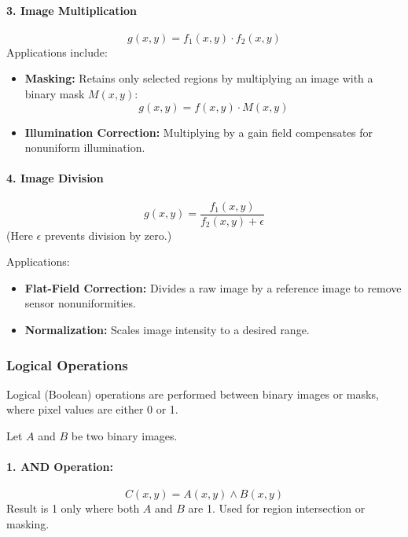 \documentclass[12pt,a4paper]{AnantDocumentation}
\begin{document}
\paragraph{3. Image Multiplication}
\begin{equation}
g(x, y) = f_1(x, y) \cdot f_2(x, y)
\end{equation}
Applications include:
\begin{itemize}
\item \textbf{Masking:} Retains only selected regions by multiplying an image with a binary mask $M(x,y)$:
\[
g(x, y) = f(x, y) \cdot M(x, y)
\]
\item \textbf{Illumination Correction:} Multiplying by a gain field compensates for nonuniform illumination.
\end{itemize}

\paragraph{4. Image Division}
\begin{equation}
g(x, y) = \frac{f_1(x, y)}{f_2(x, y) + \epsilon}
\end{equation}
(Here $\epsilon$ prevents division by zero.)

Applications:
\begin{itemize}
\item \textbf{Flat-Field Correction:} Divides a raw image by a reference image to remove sensor nonuniformities.
\item \textbf{Normalization:} Scales image intensity to a desired range.
\end{itemize}

\subsubsection{Logical Operations}
Logical (Boolean) operations are performed between binary images or masks, where pixel values are either 0 or 1.

Let $A$ and $B$ be two binary images.

\paragraph{1. AND Operation:}
\begin{equation}
C(x, y) = A(x, y) \land B(x, y)
\end{equation}
Result is 1 only where both $A$ and $B$ are 1. Used for region intersection or masking.
\end{document}
